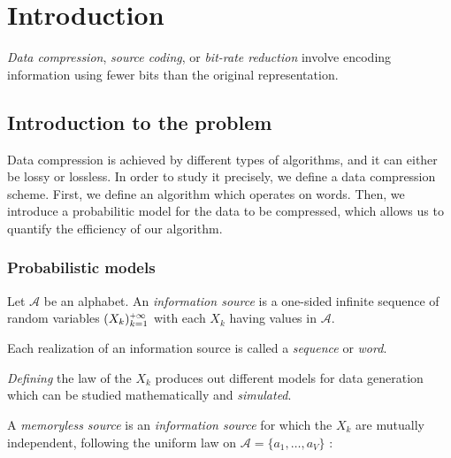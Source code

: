 \section{ Introduction }

\emph{Data compression}, \emph{source coding}, or \emph{bit-rate reduction} involve encoding information using fewer bits than the original representation.

\subsection{ Introduction to the problem }

Data compression is achieved by different types of algorithms, and it can either
be lossy or lossless. In order to study it precisely, we define a data compression
scheme. First, we define an algorithm which operates on words. Then, we introduce
a probabilitic model for the data to be compressed, which allows us to quantify
the efficiency of our algorithm.

\subsubsection{ Probabilistic models }

\begin{df}
    \label{def:source}
    Let $\mathcal{A}$ be an alphabet.
    An \emph{information source} is a one-sided infinite sequence of random
    variables $(X_k)_{k=1}^{\pinf}$ with each $X_k$ 
    having values in $\mathcal{A}$.
\end{df}

\begin{rmk}
    \label{rmk:sequence}
    Each realization of an information source is called a 
    \emph{sequence} or \emph{word}.
\end{rmk}

\begin{rmk}
    \label{rmk:source}
    \emph{Defining} the law of the $X_k$ produces out different
    models for data generation which can be studied mathematically
    and \emph{simulated}.
\end{rmk}

\begin{df}
    \label{def:memoryless}
    A \emph{memoryless source} is an \emph{information source}
    for which the $X_k$ are mutually independent, following
    the uniform law on $\mathcal{A} = \{ a_1, \dots, a_V \}$ :
\end{df}

